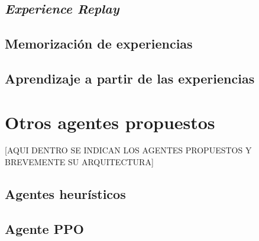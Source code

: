 \subsection{\textit{Experience Replay}}

\subsection{Memorización de experiencias}

\subsection{Aprendizaje a partir de las experiencias}

\section{Otros agentes propuestos}
[AQUI DENTRO SE INDICAN LOS AGENTES PROPUESTOS Y BREVEMENTE SU ARQUITECTURA]

\subsection{Agentes heurísticos}

\subsection{Agente PPO}